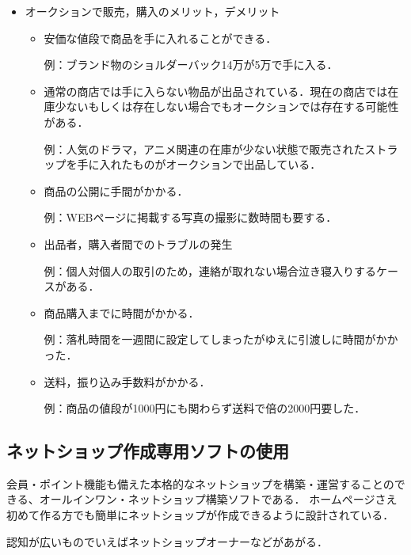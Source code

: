 \begin{itemize}
\begin{itemize}
\end{itemize}

 \item	オークションで販売，購入のメリット，デメリット

\begin{itemize}
\setlength{\parskip}{3mm}

 \item	安価な値段で商品を手に入れることができる．

例：ブランド物のショルダーバック14万が5万で手に入る．

 \item	通常の商店では手に入らない物品が出品されている．現在の商店では在庫少ないもしくは存在しない場合でもオークションでは存在する可能性がある．

例：人気のドラマ，アニメ関連の在庫が少ない状態で販売されたストラップを手に入れたものがオークションで出品している．

 \item	商品の公開に手間がかかる．

例：WEBページに掲載する写真の撮影に数時間も要する．

 \item	出品者，購入者間でのトラブルの発生

例：個人対個人の取引のため，連絡が取れない場合泣き寝入りするケースがある．

 \item	商品購入までに時間がかかる．

例：落札時間を一週間に設定してしまったがゆえに引渡しに時間がかかった．

 \item	送料，振り込み手数料がかかる．

例：商品の値段が1000円にも関わらず送料で倍の2000円要した．

\end{itemize}

\end{itemize}

\subsection{ネットショップ作成専用ソフトの使用}

会員・ポイント機能も備えた本格的なネットショップを構築・運営することのできる、オールインワン・ネットショップ構築ソフトである．
ホームページさえ初めて作る方でも簡単にネットショップが作成できるように設計されている．

認知が広いものでいえばネットショップオーナーなどがあがる．

